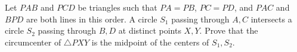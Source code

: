 Let $PAB$ and $PCD$ be triangles such that $PA=PB$, $PC=PD$, and $PAC$ and $BPD$ are both lines in this order. A circle $S_1$ passing through $A,C$ intersects a circle $S_2$ passing through $B,D$ at distinct points $X,Y$. Prove that the circumcenter of $\triangle{PXY}$ is the midpoint of the centers of $S_1,S_2$.
